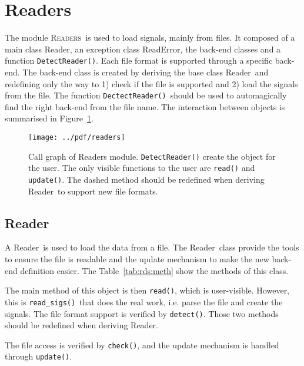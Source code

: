 \documentclass[a4paper,11pt]{article}
\newcommand{\meth}[1]{\texttt{#1()}}
\newcommand{\cls}[1]{\textsf{#1}}
\newcommand{\rd}{\cls{Reader}}
\newcommand{\rderr}{\cls{ReadError}}
\newcommand{\module}[1]{\textsc{#1}}
\begin{document}
\section{Readers}
\label{sec:readers}
The module \module{Readers}\ is used to load signals, mainly from files.
It composed of a main class \rd, an exception class \rderr, the back-end classes and a function \meth{DetectReader}.
Each file format is supported through a specific back-end.
The back-end class is created by deriving the base class \rd\ and redefining only the way to 1) check if the file is supported and 2) load the signals from the file.
The function \meth{DectectReader}\ should be used to automagically find the right back-end from the file name.
The interaction between objects is summarised in Figure~\ref{fig:rds:callgraph}.

\begin{figure}[htbp]
  \centering
  \texttt{[image: ../pdf/readers]}
  \caption{Call graph of Readers module. \meth{DetectReader} create the object for the user. The only visible functions to the user are \meth{read} and \meth{update}. The dashed method should be redefined when deriving \rd\ to support new file formats.}
  \label{fig:rds:callgraph}
\end{figure}

\subsection{Reader}
\label{sec:readers:reader}
 
A \rd\ is used to load the data from a file.
The \rd\ class provide the tools to ensure the file is readable and the update mechanism to make the new back-end definition easier.
The Table~\ref{tab:rds:meth} show the methods of this class.

The main method of this object is then \meth{read}, which is user-visible.
However, this is \meth{read\_sigs}\ that does the real work, i.e. parse the file and create the signals.
The file format support is verified by \meth{detect}.
Those two methods should be redefined when deriving \rd.

The file access is verified by \meth{check}, and the update mechanism is handled through \meth{update}.
\end{document}
